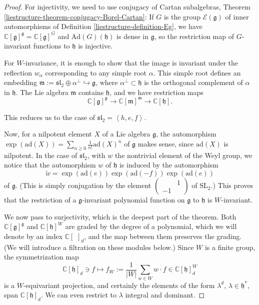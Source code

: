 \begin{proof}
For injectivity, we need to use conjugacy of Cartan subalgebras, Theorem \ref{liestructure-theorem-conjugacy-Borel-Cartan}: If $G$ is the group $\mathcal E(\mathfrak g)$ of inner automorphisms of Definition \ref{liestructure-definition-Eg}, we have $\mathbb C[\mathfrak g]^{\mathfrak g}  = \mathbb C[\mathfrak g]^G$ and $\text{Ad}(G)(\mathfrak h)$ is dense in $\mathfrak g$, so the restriction map of $G$-invariant functions to $\mathfrak h$ is injective.

For $W$-invariance, it is enough to show that the image is invariant under the reflection $w_\alpha$ corresponding to any simple root $\alpha$. This simple root defines an embedding $\mathfrak m:=\mathfrak{sl}_2 \oplus \mathfrak \alpha^{\perp}\hookrightarrow \mathfrak g$, where $\alpha^\perp \subset \mathfrak h$ is the orthogonal complement of $\alpha$ in $\mathfrak h$. The Lie algebra $\mathfrak m$ contains $\mathfrak h$, and we have restriction maps 
$$\mathbb C[\mathfrak g]^{\mathfrak g} \to \mathbb C[\mathfrak m]^{\mathfrak m} \to \mathbb C[\mathfrak h].$$

This reduces us to the case of $\mathfrak{sl}_2 = \left< h , e, f\right>$.

Now, for a nilpotent element $X$ of a Lie algebra $\mathfrak g$, the automorphism $\exp(\text{ad}(X)) = \sum_{n\ge 0} \frac{1}{n!} \text{ad}(X)^n$ of $\mathfrak g$ makes sense, since $\text{ad}(X)$ is nilpotent. In the case of $\mathfrak{sl}_2$, with $w$ the nontrivial element of the Weyl group, we notice that the automorphism $w$ of $\mathfrak h$ is induced by the automorphism
$$ \tilde w = \exp(\text{ad}(e)) \exp(\text{ad}(-f)) \exp(\text{ad}(e))$$
of $\mathfrak g$. 
(This is simply conjugation by the element $\begin{pmatrix} & 1 \\ -1 & \end{pmatrix}$ of $\text{SL}_2$.) This proves that the restriction of a $\mathfrak g$-invariant polynomial function on $\mathfrak g$ to $\mathfrak h$ is $W$-invariant.


We now pass to surjectivity, which is the deepest part of the theorem. Both $\mathbb C[\mathfrak g]^{\mathfrak g}$ and $\mathbb C[\mathfrak h]^W$ are graded by the degree of a polynomial, which we will denote by an index $\mathbb C[\,\,]_d$, and the map between them preserves the grading. (We will introduce a filtration on these modules below.) Since $W$ is a finite group, the symmetrization map 
 $$ \mathbb C[\mathfrak h]_d \ni f \mapsto f_W:=\frac{1}{|W|} \sum_{w\in W} w\cdot f \in \mathbb C[\mathfrak h]_d^W$$
 is a $W$-equivariant projection, and certainly the elements of the form $\lambda^d$, $\lambda\in \mathfrak h^*$, span $\mathbb C[\mathfrak h]_d$. We can even restrict to $\lambda$ integral and dominant. 


\end{proof}
